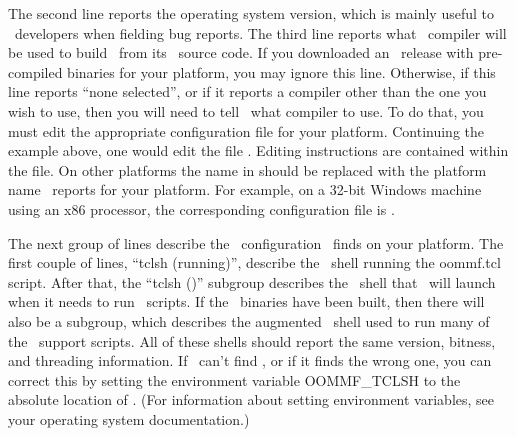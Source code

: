 The second line reports the operating system version, which is mainly
useful to \OOMMF\ developers when fielding bug reports.  The third line
reports what \Cplusplus\ compiler will be used to build \OOMMF\ from its
\Cplusplus\ source code.  If you downloaded an \OOMMF\ release with
pre-compiled binaries for your platform, you may ignore this line.
Otherwise, if this line reports ``none selected'', or if it reports a
compiler other than the one you wish to use, then you will need to tell
\OOMMF\ what compiler to use.  To do that, you must edit the appropriate
configuration file for your platform.  Continuing the example above, one
would edit the file
.  Editing
instructions are contained within the file.  On other platforms the name
 in  should be replaced with
the platform name \OOMMF\ reports for your platform.  For example, on a
32-bit Windows machine using an x86 processor, the corresponding
configuration file is .

The next group of lines describe the \Tcl\ configuration \OOMMF\ finds
on your platform.  The first couple of lines, ``tclsh (running)'',
describe the \Tcl\ shell running the oommf.tcl script.  After that, the
``tclsh (\OOMMF)'' subgroup describes the \Tcl\ shell that \OOMMF\ will
launch when it needs to run \Tcl\ scripts.  If the \OOMMF\ binaries
have been built, then there will also be a  subgroup, which
describes the augmented \Tcl\ shell used to run many of the
\OOMMF\ support scripts.  All of these shells should report the same
version, bitness, and threading information.  If \OOMMF\ can't find
, or if it finds the wrong one, you can correct this by
setting the environment variable
OOMMF\_TCLSH to the absolute
location of .  (For information about setting environment
variables, see your operating system documentation.)


